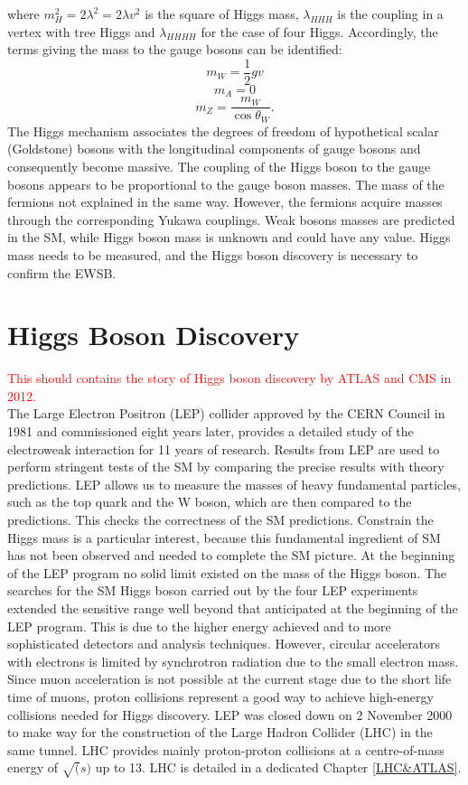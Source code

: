 where $m_{H}^{2}=2 \lambda^{2}=2 \lambda v^{2}$ is the square of Higgs mass, $\lambda_{HHH}$ is the coupling in a vertex with tree Higgs and $\lambda_{HHHH}$ for the case of four Higgs.
Accordingly, the terms giving the mass to the gauge bosons can be identified:
\begin{equation}
m_{W} = \frac{1}{2}gv 
\end{equation}
\begin{equation}
m_{A} = 0    
\end{equation}
\begin{equation}
m_{Z} = \frac{m_{W}}{\cos\theta_{W}}.
\end{equation}
The Higgs mechanism associates the degrees of freedom of hypothetical scalar (Goldstone) bosons with the longitudinal components of gauge bosons and consequently become massive. The coupling of the Higgs boson to the gauge bosons appears to be proportional to the gauge boson masses. The mass of the fermions not explained in the same way. However, the fermions acquire masses through the corresponding Yukawa couplings.  Weak bosons masses are predicted in the SM, while  Higgs boson mass is unknown and could have any value. Higgs mass needs to be measured, and the Higgs boson discovery is necessary to confirm the EWSB.
\section{Higgs Boson Discovery}
\label{chap1:H2012}
\textcolor{red}{This should contains the story of Higgs boson discovery by ATLAS and CMS in 2012. \\}
The Large Electron Positron (LEP) collider approved by the CERN Council in 1981 and commissioned eight years later, provides a detailed study of the electroweak interaction for 11 years of research. Results from LEP are used to perform stringent tests of the SM by comparing the precise results with theory predictions. LEP allows us to measure the masses of heavy fundamental particles, such as the top quark and the W boson, which are then compared to the predictions. This checks the correctness of the SM predictions. Constrain the Higgs mass is a particular interest, because this fundamental ingredient of SM has not been observed and needed to complete the SM picture. At the beginning of the LEP program no solid limit existed on the mass of the Higgs boson. The searches for the SM Higgs boson carried out by the four LEP experiments extended the sensitive range well beyond that anticipated at the beginning of the LEP program. This is due to the higher energy achieved and to more sophisticated detectors and analysis techniques. However, circular accelerators with electrons is limited by synchrotron radiation due to the small electron mass. Since muon acceleration is not possible at the current stage due to the short life time of muons, proton collisions represent a good way to achieve high-energy collisions needed for Higgs discovery. LEP was closed down on 2 November 2000 to make way for the construction of the Large Hadron Collider (LHC) in the same tunnel. LHC provides mainly proton-proton collisions at a centre-of-mass energy of $\sqrt(s)$ up to 13. LHC is detailed in a dedicated Chapter \ref{LHC&ATLAS}. 
